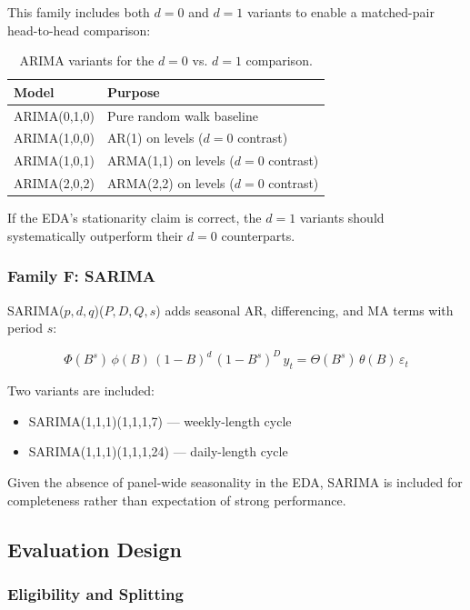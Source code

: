 This family includes both $d = 0$ and $d = 1$ variants to enable a matched-pair head-to-head comparison:

\begin{table}[H]
\centering
\caption{ARIMA variants for the $d=0$ vs. $d=1$ comparison.}
\begin{tabular}{ll}
\toprule
\textbf{Model} & \textbf{Purpose} \\
\midrule
ARIMA(0,1,0) & Pure random walk baseline \\
ARIMA(1,0,0) & AR(1) on levels ($d=0$ contrast) \\
ARIMA(1,0,1) & ARMA(1,1) on levels ($d=0$ contrast) \\
ARIMA(2,0,2) & ARMA(2,2) on levels ($d=0$ contrast) \\
\bottomrule
\end{tabular}
\end{table}

If the EDA's stationarity claim is correct, the $d=1$ variants should systematically outperform their $d=0$ counterparts.

\subsubsection{Family F: SARIMA}

SARIMA($p, d, q$)($P, D, Q, s$) adds seasonal AR, differencing, and MA terms with period $s$:

\begin{equation}
\Phi(B^s)\, \phi(B)\, (1-B)^d\, (1-B^s)^D\, y_t = \Theta(B^s)\, \theta(B)\, \varepsilon_t
\end{equation}

Two variants are included:
\begin{itemize}
    \item SARIMA(1,1,1)(1,1,1,7) --- weekly-length cycle
    \item SARIMA(1,1,1)(1,1,1,24) --- daily-length cycle
\end{itemize}

Given the absence of panel-wide seasonality in the EDA, SARIMA is included for completeness rather than expectation of strong performance.

\subsection{Evaluation Design}

\subsubsection{Eligibility and Splitting}

